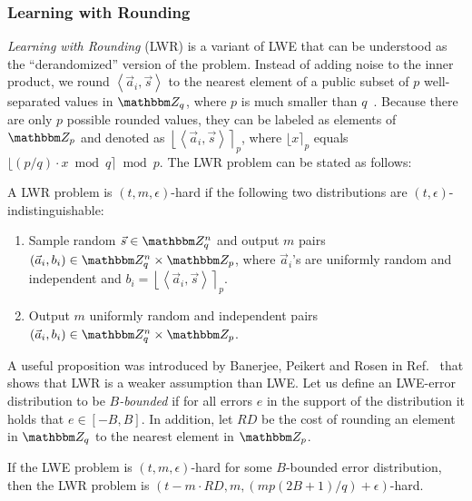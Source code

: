 \subsubsection{Learning with Rounding}
\emph{Learning with Rounding} (LWR) is a variant of LWE that can be understood as the ``derandomized'' version of the problem.
Instead of adding noise to the inner product, we round $\left\langle \vec{a}_i, \vec{s}\right\rangle$ to the nearest element of a public subset of $p$ well-separated values in $\Z_q$, where $p$ is much smaller than $q$~\cite{bogdanov2017pseudorandom}.
Because there are only $p$ possible rounded values, they can be labeled as elements of $\Z_p$ and denoted as $\left\lfloor\left\langle \vec{a}_i, \vec{s}\right\rangle\right\rceil_p$, where $\lfloor x \rceil_p$ equals $\lfloor (p/q)\cdot x \bmod q\rceil \bmod p$.
The LWR problem can be stated as follows:
\begin{definition}
	A LWR problem is $(t, m, \epsilon)$-hard if the following two distributions are $(t, \epsilon)$-indistinguishable:
	\begin{enumerate}
		\item Sample random $\vec{s} \in \Z_q^n$ and output $m$ pairs $\left(\vec{a}_i, b_i\right) \in \Z_q^n \times \Z_p$, where $\vec{a}_i$'s are uniformly random and independent and $b_i = \left\lfloor\left\langle \vec{a}_i, \vec{s}\right\rangle\right\rceil_p$.
		\item Output $m$ uniformly random and independent pairs $\left(\vec{a}_i, b_i\right) \in \Z_q^n \times \Z_p$.
	\end{enumerate}
\end{definition}

A useful proposition was introduced by Banerjee, Peikert and Rosen in Ref.~\cite{banerjee2012pseudorandom} that shows that LWR is a weaker assumption than LWE.
Let us define an LWE-error distribution to be \emph{$B$-bounded} if for all errors $e$ in the support of the distribution it holds that $e \in [-B, B]$.
In addition, let $RD$ be the cost of rounding an element in $\Z_q$ to the nearest element in $\Z_p$.

\begin{proposition}\label{prop:lwe2lwr}
	If the LWE problem is $(t, m, \epsilon)$-hard for some $B$-bounded error distribution, then the LWR problem is $(t-m\cdot RD, m, (mp(2B+1)/q)+\epsilon)$-hard.
\end{proposition}

